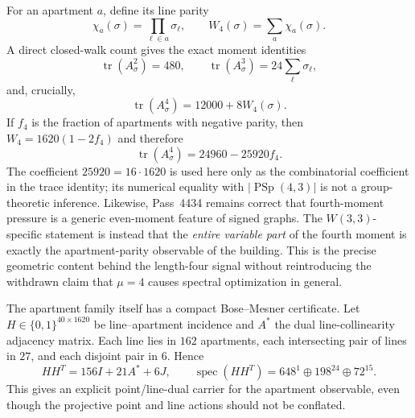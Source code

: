 For an apartment $a$, define its line parity
\[
 \chi_a(\sigma)=\prod_{\ell\in a}\sigma_\ell,
 \qquad
 W_4(\sigma)=\sum_{a}\chi_a(\sigma).
\]
A direct closed-walk count gives the exact moment identities
\begin{equation}
 \boxed{\operatorname{tr}(A_\sigma^2)=480,}
 \qquad
 \boxed{\operatorname{tr}(A_\sigma^3)=24\sum_{\ell}\sigma_\ell,}
 \label{eq:pass4461-low-moments}
\end{equation}
and, crucially,
\begin{equation}
 \boxed{\operatorname{tr}(A_\sigma^4)=12000+8W_4(\sigma).}
 \label{eq:pass4461-fourth-moment}
\end{equation}
If $f_4$ is the fraction of apartments with negative parity, then
$W_4=1620(1-2f_4)$ and therefore
\begin{equation}
 \boxed{\operatorname{tr}(A_\sigma^4)=24960-25920f_4.}
 \label{eq:pass4461-frustration-law}
\end{equation}
The coefficient $25920=16\cdot1620$ is used here only as the combinatorial
coefficient in the trace identity; its numerical equality with
$|\operatorname{PSp}(4,3)|$ is not a group-theoretic inference.  Likewise,
Pass~4434 remains correct that fourth-moment pressure is a generic even-moment
feature of signed graphs.  The $W(3,3)$-specific statement is instead that the
\emph{entire variable part} of the fourth moment is exactly the apartment-parity
observable of the building.  This is the precise geometric content behind the
length-four signal without reintroducing the withdrawn claim that $\mu=4$
causes spectral optimization in general.

The apartment family itself has a compact Bose--Mesner certificate.  Let
$H\in\{0,1\}^{40\times1620}$ be line--apartment incidence and $A^\ast$ the dual
line-collinearity adjacency matrix.  Each line lies in $162$ apartments, each
intersecting pair of lines in $27$, and each disjoint pair in $6$.  Hence
\begin{equation}
 \boxed{HH^T=156I+21A^\ast+6J,}
 \qquad
 \boxed{\operatorname{spec}(HH^T)=648^1\oplus198^{24}\oplus72^{15}.}
 \label{eq:pass4461-apartment-gram}
\end{equation}
This gives an explicit point/line-dual carrier for the apartment observable,
even though the projective point and line actions should not be conflated.

